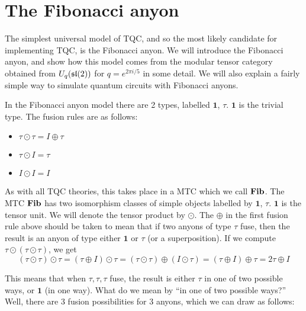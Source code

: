 \section{The Fibonacci anyon}
The simplest universal model of TQC, and so the most likely candidate for
implementing TQC, is the Fibonacci anyon. We will introduce the Fibonacci
anyon, and show how this model comes from the modular tensor category obtained
from $U_q(\mathfrak{sl}(2))$ for $q=e^{2\pi i/5}$ in some detail. We will also explain a
fairly simple way to simulate quantum circuits with Fibonacci anyons.

In the Fibonacci anyon model there are 2 types, labelled $\mathbf{1}$, $\tau$.
$\mathbf{1}$ is the trivial type. The fusion rules are as follows: 


\begin{itemize}
    \item $\tau \odot \tau = I \oplus \tau$
    \item $\tau \odot I = \tau$
    \item $I \odot I = I$
\end{itemize}

As with all TQC theories, this takes place in a MTC which we call $\mathbf{Fib}$. The
MTC $\mathbf{Fib}$ has two isomorphism classes of simple objects labelled by
$\mathbf{1}$, $\tau$. $\mathbf{1}$ is the tensor unit. We will denote the
tensor product by $\odot$. The $\oplus$ in the first fusion rule above should
be taken to mean that if two anyons of type $\tau$ fuse, then the result is an
anyon of type either $\mathbf{1}$ or $\tau$ (or a superposition). If we compute
$\tau \odot (\tau \odot \tau)$, we get
\begin{equation}
    (\tau \odot \tau) \odot \tau = (\tau \oplus I) \odot \tau = (\tau \odot \tau) \oplus (I \odot \tau) = (\tau \oplus I) \oplus \tau = 2\tau \oplus I
\end{equation}

This means that when $\tau,\tau,\tau$ fuse, the result is either $\tau$ in one of
two possible ways, or $\mathbf{1}$ (in one way). What do we mean by ``in one of two
possible ways?'' Well, there are 3 fusion possibilities for 3 anyons, which we
can draw as follows: 

\newcommand{\fusiondiagram}[2]
{
\begin{pspicture}(0,-0.99125)(2.841875,0.99125)
\psline[linewidth=0.01cm]{->}(0.2209375,0.63)(0.65,0.2)
\psline[linewidth=0.01cm]{->}(1.4209375,0.63)(1.05,0.2)
\psline[linewidth=0.01cm]{->}(0.8209375, -0.12)(1.2209375,-0.57125)
\psline[linewidth=0.01cm]{->}(2.6209376,0.63)(1.5,-0.57125)
\rput(1.531875,0.79875) {$\tau$}
\rput(0.111875,0.79875) {$\tau$}
\rput(2.691875,0.79875) {$\tau$}
\rput(0.85, 0.1)    {$#1$}
\rput(1.35,-0.7)        {$#2$}
\end{pspicture} 
}


